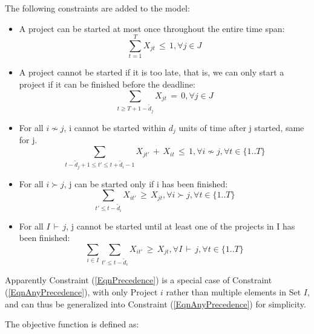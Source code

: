 \documentclass[final,3p,times]{elsarticle}
\begin{document}
The following constraints are added to the model:

\begin{itemize}
	
	\item A project can be started at most once throughout the entire time span:
	\begin{equation}
		\label{EqnConstraintStartOnlyOnce}
		\sum\limits_{t=1}^{T} X_{jt}\,\leq\,1,\forall j \in J
	\end{equation}
	
	\item A project cannot be started if it is too late, that is, we can only start a project if it can be finished before the deadline:
	\begin{equation}
		\sum\limits_{t\geq T+1-\tilde{d}_j} X_{jt}\,=\,0, \forall j \in J
	\end{equation}
	
	\item For all $i \nsim j$, i cannot be started within $d_j$ units of time after j started, same for j.
	\begin{equation}
		\sum\limits_{t-\tilde{d}_j+1\leq t'\leq t+\tilde{d}_i-1} X_{jt'}\,+\,X_{it}\,\leq\,1,\forall i \nsim j, \forall t \in \{1 .. T\}
	\end{equation}
	
	\item For all $i \succ j$, j can be started only if i has been finished:
	\begin{equation}
		\label{EqnPrecedence}
		\sum\limits_{t'\leq t-\tilde{d}_i} X_{it'} \,\geq\, X_{jt},\forall i\succ j, \forall t \in \{1 .. T\} 
	\end{equation}
	
	\item For all $I\,\vdash\,j$, j cannot be started until at least one of the projects in I has been finished:
	\begin{equation}
		\label{EqnAnyPrecedence}
		\sum\limits_{i\in I}\sum\limits_{t'\leq t-\tilde{d}_i} X_{it'}\,\geq\,X_{jt},\forall I\,\vdash\,j, \forall t \in \{1 .. T\}
	\end{equation}
\end{itemize}

Apparently Constraint (\ref{EqnPrecedence}) is a special case of Constraint (\ref{EqnAnyPrecedence}), with only Project $i$ rather than multiple elements in Set $I$, and can thus be generalized into Constraint (\ref{EqnAnyPrecedence}) for simplicity.

The objective function is defined as:
\end{document}
